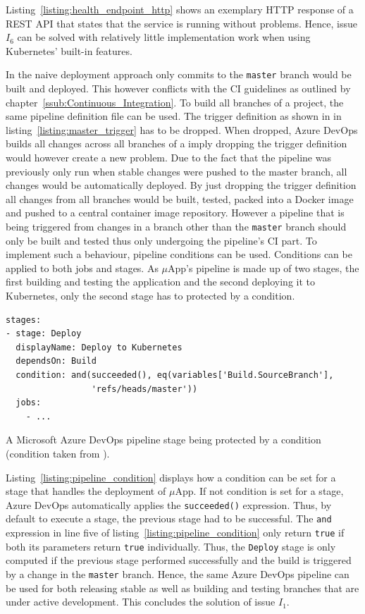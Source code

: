 Listing~\ref{listing:health_endpoint_http} shows an exemplary \ac{HTTP}
response of a \ac{REST} \ac{API} that states that the service is running
without problems. Hence, issue $I_6$ can be solved with relatively little
implementation work when using Kubernetes' built-in features.

In the naive deployment approach only commits to the \texttt{master} branch
would be built and deployed. This however conflicts with the \ac{CI} guidelines
as outlined by chapter~\ref{ssub:Continuous_Integration}. To build all branches
of a project, the same pipeline definition file can be used. The trigger
definition as shown in in listing~\ref{listing:master_trigger} has to be
dropped. When dropped, Azure DevOps builds all changes across all branches of a
imply dropping the trigger definition would however create a new problem. Due
to the fact that the pipeline was previously only run when stable changes were
pushed to the master branch, all changes would be automatically deployed. By
just dropping the trigger definition all changes from all branches would be
built, tested, packed into a Docker image and pushed to a central container
image repository. However a pipeline that is being triggered from changes in a
branch other than the \texttt{master} branch should only be built and tested
thus only undergoing the pipeline's \ac{CI} part. To implement such a
behaviour, pipeline conditions can be used. Conditions can be applied to both
jobs and stages. As $\mu$App's pipeline is made up of two stages, the first
building and testing the application and the second deploying it to Kubernetes,
only the second stage has to protected by a condition.

\begin{listing}[H]
  \begin{verbatim}
stages:
- stage: Deploy
  displayName: Deploy to Kubernetes
  dependsOn: Build
  condition: and(succeeded(), eq(variables['Build.SourceBranch'],
                 'refs/heads/master'))
  jobs:
    - ...
  \end{verbatim}
  \caption{A Microsoft Azure DevOps pipeline stage being protected by a
  condition (condition taken from \autocite{MicrosoftConditions2019}).}%
  \label{listing:pipeline_condition}
\end{listing}

Listing~\ref{listing:pipeline_condition} displays how a condition can be set
for a stage that handles the deployment of $\mu$App. If not condition is set
for a stage, Azure DevOps automatically applies the \texttt{succeeded()}
expression. Thus, by default to execute a stage, the previous stage had to be
successful. The \texttt{and} expression in line five of
listing~\ref{listing:pipeline_condition} only return \texttt{true} if both its
parameters return \texttt{true} individually. Thus, the \texttt{Deploy} stage
is only computed if the previous stage performed successfully and the build is
triggered by a change in the \texttt{master} branch. Hence, the same Azure
DevOps pipeline can be used for both releasing stable as well as building and
testing branches that are under active development. This concludes the solution
of issue $I_1$.

